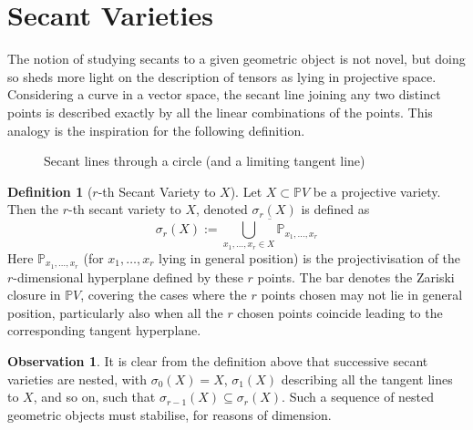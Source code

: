 \documentclass[12pt,a4paper,oneside]{book}
\def\proj{\mathbb{P}} %
\theoremstyle{definition}
\newtheorem{definition}{Definition}[section]
\newtheorem*{observation}{Observation}
\begin{document}
\section{Secant Varieties}\label{section:secantvarieties}
The notion of studying secants to a given geometric object is not novel, but doing so sheds more light on the description of tensors as lying in projective space. Considering a curve in a vector space, the secant line joining any two distinct points is described exactly by all the linear combinations of the points. This analogy is the inspiration for the following definition.
\begin{figure}
    \centering
    \caption{Secant lines through a circle (and a limiting tangent line)}\label{figure:secantexample}
\end{figure}
\begin{definition}[$r$-th Secant Variety to $X$]\label{defn:secantvariety}
    Let $X \subset \proj V$ be a projective variety. Then the $r$-th secant variety to $X$, denoted $\sigma_r(X)$ is defined as $$\sigma_r(X) := \overline{\bigcup_{x_1, \ldots, x_r \in X} \proj_{x_1, \ldots, x_r}}$$Here $\proj_{x_1, \ldots, x_r}$ (for $x_1, \ldots, x_r$ lying in general position) is the projectivisation of the $r$-dimensional hyperplane defined by these $r$ points. The bar denotes the Zariski closure in $\proj V$, covering the cases where the $r$ points chosen may not lie in general position, particularly also when all the $r$ chosen points coincide leading to the corresponding tangent hyperplane.
\end{definition}
\begin{observation}
    It is clear from the definition above that successive secant varieties are nested, with $\sigma_0(X) = X$, $\sigma_1(X)$ describing all the tangent lines to $X$, and so on, such that $\sigma_{r-1}(X) \subseteq \sigma_r(X)$. Such a sequence of nested geometric objects must stabilise, for reasons of dimension. 
\end{observation}
\end{document}
